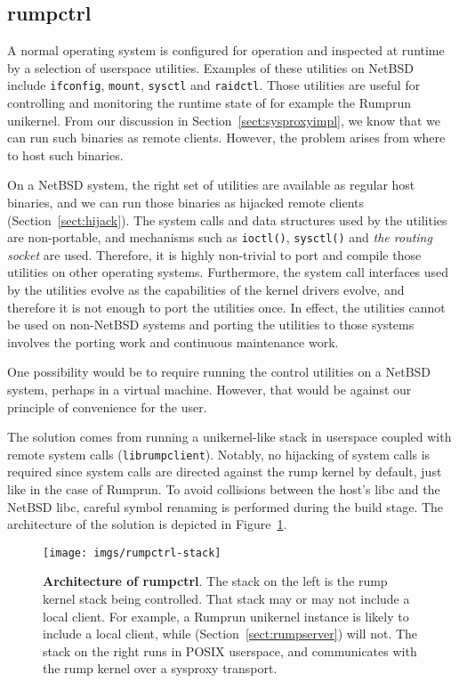 \subsection{rumpctrl}
\label{sect:rumpctrl}

A normal operating system is configured for operation and inspected
at runtime by a selection of userspace utilities.  Examples of
these utilities on NetBSD include \texttt{ifconfig}, \texttt{mount},
\texttt{sysctl} and \texttt{raidctl}.  Those utilities are useful for
controlling and monitoring the runtime state of for example the Rumprun
unikernel.  From our discussion in Section~\ref{sect:sysproxyimpl},
we know that we can run such binaries as remote clients.  However, the
problem arises from where to host such binaries.

On a NetBSD system, the right set of utilities are available as regular
host binaries, and we can run those binaries as hijacked remote clients
(Section~\ref{sect:hijack}).  The system calls and data
structures used by the utilities are non-portable, and mechanisms such
as \texttt{ioctl()}, \texttt{sysctl()} and \textit{the routing socket}
are used.  Therefore, it is highly non-trivial to port and compile
those utilities on other operating systems.  Furthermore, the system
call interfaces used by the utilities evolve as the capabilities of
the kernel drivers evolve, and therefore it is not enough to port the
utilities once.  In effect, the utilities cannot be used on non-NetBSD
systems and porting the utilities to those systems involves the porting
work and continuous maintenance work.

One possibility would be to require running the control utilities on
a NetBSD system, perhaps in a virtual machine.  However, that would
be against our principle of convenience for the user.

The solution comes from running a unikernel-like stack in userspace
coupled with remote system calls (\texttt{librumpclient}).  Notably, no
hijacking of system calls is required since system calls are directed
against the rump kernel by default, just like in the case of Rumprun.
To avoid collisions between the host's libc and the NetBSD libc, careful
symbol renaming is performed during the build stage.  The architecture
of the solution is depicted in Figure~\ref{fig:rumpctrl-stack}.

\begin{figure}[t]
\texttt{[image: imgs/rumpctrl-stack]}
\caption[Architecture of rumpctrl]{\textbf{Architecture of rumpctrl}.
The stack on the left is the rump kernel stack being controlled.
That stack may or may not include a local client.  For example,
a Rumprun unikernel instance is likely to include a local client, while
\texttt{} (Section~\ref{sect:rumpserver}) will
not.  The stack on the right runs in POSIX userspace, and communicates
with the rump kernel over a sysproxy transport.
}
\label{fig:rumpctrl-stack}
\end{figure}

